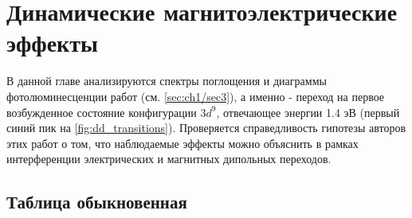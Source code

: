 \chapter{Динамические магнитоэлектрические эффекты}\label{ch:ch3}

В данной главе анализируются спектры поглощения и диаграммы фотолюминесценции работ \cite{Toyoda2015, Toyoda2016} (см. \cref{sec:ch1/sec3}), а именно - переход на первое возбужденное состояние конфигурации \(3d^9\), отвечающее энергии 1.4 эВ (первый синий пик на \cref{fig:dd_transitions}). Проверяется справедливость гипотезы авторов этих работ о том, что наблюдаемые эффекты можно объяснить в рамках интерференции электрических и магнитных дипольных переходов.

\section{Таблица обыкновенная}\label{sec:ch3/sect1}



\clearpage
